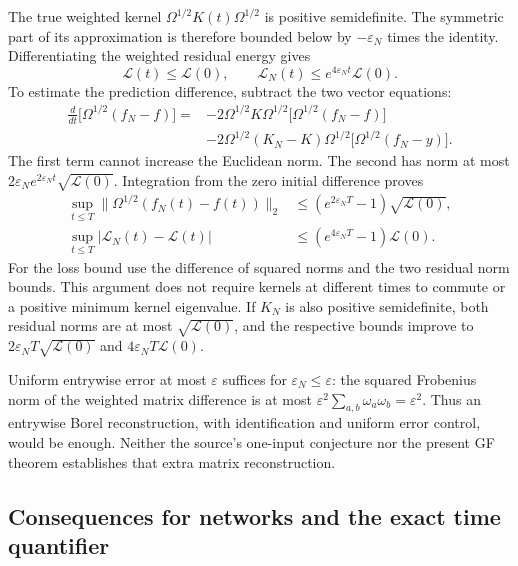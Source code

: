 The true weighted kernel $\Omega^{1/2}K(t)\Omega^{1/2}$ is positive
semidefinite.  The symmetric part of its approximation is therefore bounded
below by $-\varepsilon_N$ times the identity.  Differentiating the weighted
residual energy gives
\[
 \mathcal L(t)\le\mathcal L(0),\qquad
 \mathcal L_N(t)\le e^{4\varepsilon_Nt}\mathcal L(0).
\]
To estimate the prediction difference, subtract the two vector equations:
\begin{align*}
 \frac{d}{dt}\bigl[\Omega^{1/2}(f_N-f)\bigr]
 ={}&-2\Omega^{1/2}K\Omega^{1/2}
                  \bigl[\Omega^{1/2}(f_N-f)\bigr]\\
    &-2\Omega^{1/2}(K_N-K)\Omega^{1/2}
                  \bigl[\Omega^{1/2}(f_N-y)\bigr].
\end{align*}
The first term cannot increase the Euclidean norm.  The second has norm at
most $2\varepsilon_Ne^{2\varepsilon_Nt}\sqrt{\mathcal L(0)}$.
Integration from the zero initial difference proves
\begin{align*}
 \sup_{t\le T}\|\Omega^{1/2}(f_N(t)-f(t))\|_2
 &\le (e^{2\varepsilon_NT}-1)\sqrt{\mathcal L(0)},\\
 \sup_{t\le T}|\mathcal L_N(t)-\mathcal L(t)|
 &\le (e^{4\varepsilon_NT}-1)\mathcal L(0).
\end{align*}
For the loss bound use the difference of squared norms and the two residual
norm bounds.  This argument does not require kernels at different times to
commute or a positive minimum kernel eigenvalue.  If $K_N$ is also positive
semidefinite, both residual norms are at most $\sqrt{\mathcal L(0)}$, and
the respective bounds improve to
$2\varepsilon_NT\sqrt{\mathcal L(0)}$ and
$4\varepsilon_NT\mathcal L(0)$.

Uniform entrywise error at most $\varepsilon$ suffices for
$\varepsilon_N\le\varepsilon$: the squared Frobenius norm of the weighted
matrix difference is at most
$\varepsilon^2\sum_{a,b}\omega_a\omega_b=\varepsilon^2$.
Thus an entrywise Borel reconstruction, with identification and uniform
error control, would be enough.  Neither the source's one-input conjecture
nor the present GF theorem establishes that extra matrix reconstruction.

\subsection{Consequences for networks and the exact time quantifier}

